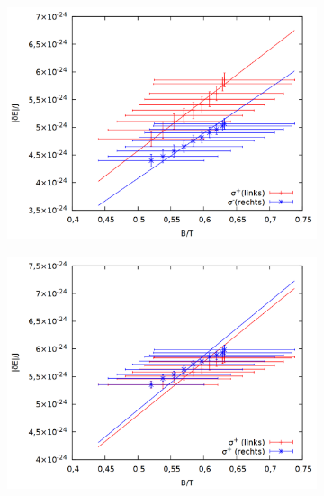 \begin{figure}
\centering
\begin{subfigure}{0.6\textwidth}
\includegraphics[width=\textwidth]{data/zeeman/out_zeeman_neu_links_prop.png}
\end{subfigure}
\begin{subfigure}{0.6\textwidth}
\includegraphics[width=\textwidth]{data/zeeman/out_zeeman_neu_mitte_prop.png}
\end{subfigure}
\begin{subfigure}{0.6\textwidth}

\end{subfigure}
\end{figure}
